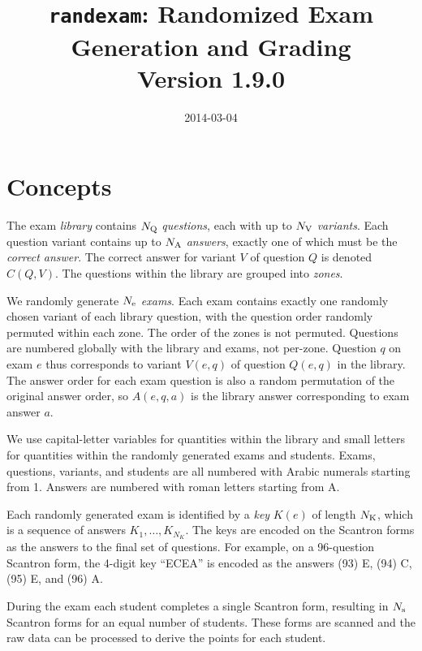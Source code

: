 \documentclass{article}
\begin{document}
\title{\texttt{randexam}: Randomized Exam Generation and Grading\\[1em] \Large Version 1.9.0}
\date{\vspace*{-2em}2014-03-04}
\maketitle

\section{Concepts}

The exam \emph{library} contains $N_{\rm Q}$ \emph{questions}, each
with up to $N_{\rm V}$ \emph{variants}. Each question variant contains
up to $N_{\rm A}$ \emph{answers}, exactly one of which must be the
\emph{correct answer}. The correct answer for variant $V$ of question
$Q$ is denoted $C(Q,V)$. The questions within the library are grouped
into \emph{zones}.

We randomly generate $N_{\rm e}$ \emph{exams}. Each exam contains
exactly one randomly chosen variant of each library question, with the
question order randomly permuted within each zone. The order of the
zones is not permuted. Questions are numbered globally with the
library and exams, not per-zone. Question $q$ on exam $e$ thus
corresponds to variant $V(e,q)$ of question $Q(e,q)$ in the
library. The answer order for each exam question is also a random
permutation of the original answer order, so $A(e,q,a)$ is the library
answer corresponding to exam answer $a$.

We use capital-letter variables for quantities within the library
and small letters for quantities within the randomly generated exams
and students. Exams, questions, variants, and students are all
numbered with Arabic numerals starting from 1. Answers are numbered
with roman letters starting from A.

Each randomly generated exam is identified by a \emph{key} $K(e)$ of
length $N_{\rm K}$, which is a sequence of answers
$K_1,\ldots,K_{N_K}$. The keys are encoded on the Scantron forms as
the answers to the final set of questions. For example, on a
96-question Scantron form, the 4-digit key ``ECEA'' is encoded as the
answers (93) E, (94) C, (95) E, and (96) A.

During the exam each student completes a single Scantron form,
resulting in $N_{\rm s}$ Scantron forms for an equal number of
students. These forms are scanned and the raw data can be processed to
derive the points for each student.
\end{document}
